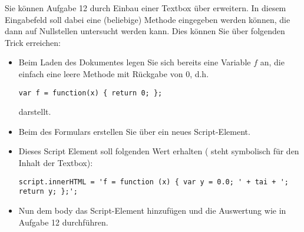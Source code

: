 %
\par Sie können Aufgabe 12 durch Einbau einer Textbox über 
erweitern. In diesem Eingabefeld soll dabei eine (beliebige) Methode eingegeben
werden können, die dann auf Nullstellen untersucht werden kann. Dies können Sie
über folgenden Trick erreichen:
%
\begin{itemize}
\item Beim Laden des Dokumentes legen Sie sich bereits eine Variable $f$ an,
die einfach eine leere Methode mit Rückgabe von $0$, d.h. 
%
\begin{lstlisting}
var f = function(x) { return 0; };
\end{lstlisting}
%
darstellt.
\item
Beim  des Formulars erstellen Sie über  ein
neues Script-Element.
\item
Dieses Script Element soll folgenden  Wert erhalten (
steht symbolisch für den Inhalt der Textbox):
%
\begin{lstlisting}
script.innerHTML = 'f = function (x) { var y = 0.0; ' + tai + '; return y; };';
\end{lstlisting}
%
\item 
Nun dem body das Script-Element hinzufügen und die Auswertung wie in Aufgabe 12
durchführen.
\end{itemize}